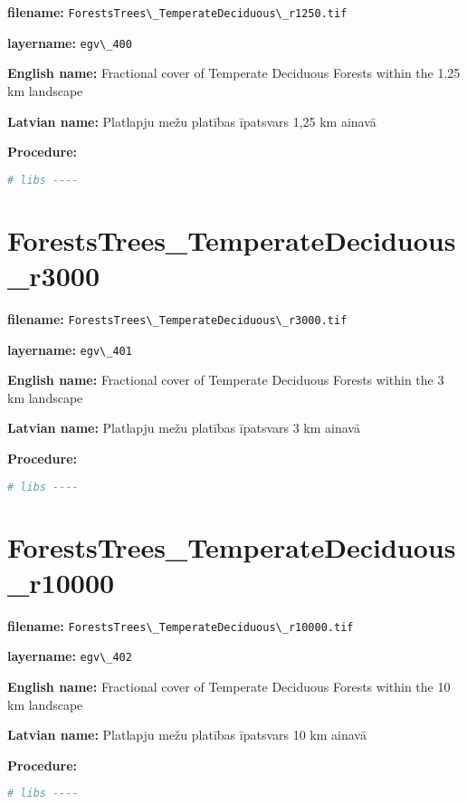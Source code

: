 \documentclass[
]{book}
\newcommand{\passthrough}[1]{#1}
\begin{document}
\textbf{filename:} \passthrough{\lstinline!ForestsTrees\_TemperateDeciduous\_r1250.tif!}

\textbf{layername:} \passthrough{\lstinline!egv\_400!}

\textbf{English name:} Fractional cover of Temperate Deciduous Forests within the 1.25 km landscape

\textbf{Latvian name:} Platlapju mežu platības īpatsvars 1,25 km ainavā

\textbf{Procedure:}

\begin{lstlisting}[language=R]
# libs ----
\end{lstlisting}

\section{ForestsTrees\_TemperateDeciduous\_r3000}\label{ch06.401}

\textbf{filename:} \passthrough{\lstinline!ForestsTrees\_TemperateDeciduous\_r3000.tif!}

\textbf{layername:} \passthrough{\lstinline!egv\_401!}

\textbf{English name:} Fractional cover of Temperate Deciduous Forests within the 3 km landscape

\textbf{Latvian name:} Platlapju mežu platības īpatsvars 3 km ainavā

\textbf{Procedure:}

\begin{lstlisting}[language=R]
# libs ----
\end{lstlisting}

\section{ForestsTrees\_TemperateDeciduous\_r10000}\label{ch06.402}

\textbf{filename:} \passthrough{\lstinline!ForestsTrees\_TemperateDeciduous\_r10000.tif!}

\textbf{layername:} \passthrough{\lstinline!egv\_402!}

\textbf{English name:} Fractional cover of Temperate Deciduous Forests within the 10 km landscape

\textbf{Latvian name:} Platlapju mežu platības īpatsvars 10 km ainavā

\textbf{Procedure:}

\begin{lstlisting}[language=R]
# libs ----
\end{lstlisting}
\end{document}
